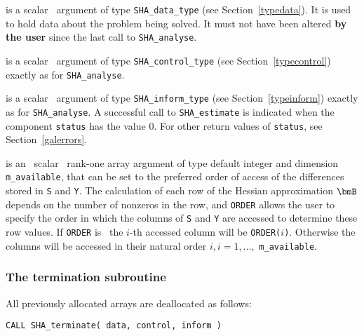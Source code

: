 \documentclass{galahad}
\newcommand{\packagename}{SHA}
\begin{document}
\begin{description}
 is a scalar \intentinout\ argument of type
{\tt \packagename\_data\_type}
(see Section~\ref{typedata}). It is used to hold data about the problem being
solved. It must not have been altered {\bf by the user} since the last call to
{\tt \packagename\_analyse}.

 is a scalar \intentin\ argument of type
{\tt \packagename\_control\_type}
(see Section~\ref{typecontrol})
exactly as for
{\tt \packagename\_analyse}.

 is a scalar \intentinout\ argument of type
{\tt \packagename\_inform\_type}
(see Section~\ref{typeinform})
exactly as for
{\tt \packagename\_analyse}.
A successful call to
{\tt \packagename\_estimate}
is indicated when the  component {\tt status} has the value 0.
For other return values of {\tt status}, see Section~\ref{galerrors}.

 is an \optional\ scalar \intentin\ rank-one array argument
of type default integer and dimension {\tt m\_available}, that can be set
to the preferred order of access of the differences stored
in {\tt S} and {\tt Y}. The calculation of each row of the
Hessian approximation $\bmB$ depends on the number of nonzeros in the row,
and {\tt ORDER} allows the user to specify the order in which the columns
of  {\tt S} and {\tt Y} are accessed to determine these row values.
If {\tt ORDER} is \present\, the $i$-th accessed column will be
{\tt ORDER(}$i${\tt )}. Otherwise the columns will be accessed
in their natural order $i, i = 1, \ldots ,$ {\tt m\_available}.

\end{description}


\subsubsection{The  termination subroutine}
All previously allocated arrays are deallocated as follows:
\vspace*{1mm}

\hspace{8mm}
{\tt CALL \packagename\_terminate( data, control, inform )}
\end{document}

